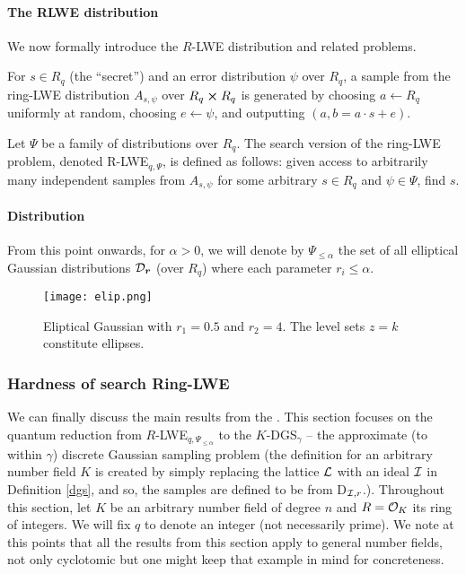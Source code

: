 \paragraph{The RLWE distribution}
We now formally introduce the $R$-LWE distribution and related problems.

\begin{definition}
	For $s \in R_q$ (the ``secret'') and an error distribution $\psi$ over $R_q$, a sample from the ring-LWE distribution $A_{s, \psi}$ over $R_q \cross R_q$ is generated by choosing $a \leftarrow R_q$ uniformly at random, choosing $e \leftarrow \psi$, and outputting $(a, b = a \cdot s + e)$.
\end{definition}
\begin{definition}
	Let $\Psi$ be a family of distributions over $R_q$. The search version of the ring-LWE problem, denoted R-LWE$_{q, \Psi}$, is defined as follows: given access to arbitrarily many independent samples from $A_{s, \psi}$ for some arbitrary $s \in R_q$ and $\psi \in \Psi$, find $s$.
\end{definition}
\paragraph{Distribution}
From this point onwards, for $\alpha > 0$, we will denote by $\Psi_{\leq \alpha}$ the set of all elliptical Gaussian distributions $\mathcal{D}_{\boldsymbol{r}}$ (over $R_q$) where each parameter $r_i \leq \alpha$.
\begin{figure}[ht]
	\centering
	\texttt{[image: elip.png]}
	\caption{Eliptical Gaussian with $r_1 = 0.5$ and $r_2 = 4$. The level sets $z=k$ constitute ellipses.}
	\label{elip-gauss}
\end{figure}
\subsubsection{Hardness of search Ring-LWE}\label{h-rlwe}
We can finally discuss the main results from the \cite{ring-lwe}. This section focuses on the quantum reduction from $R$-LWE$_{q, \Psi_{\leq \alpha}}$ to the $K$-DGS$_{\gamma}$ -- the approximate (to within $\gamma$) discrete Gaussian sampling problem (the definition for an arbitrary number field $K$ is created by simply replacing the lattice $\mathcal{L}$ with an ideal $\mathcal{I}$ in Definition \ref{dgs}, and so, the samples are defined to be from D$_{\mathcal{I}, r}$.). Throughout this section, let $K$ be an arbitrary number field of degree $n$ and $R = \mathcal{O}_K$ its ring of integers. We will fix $q$ to denote an integer (not necessarily prime). We note at this points that all the results from this section apply to general number fields, not only cyclotomic but one might keep that example in mind for concreteness.

